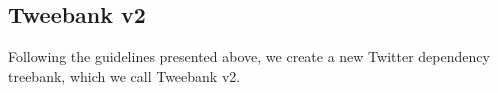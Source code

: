 \documentclass[11pt,a4paper]{article}
\begin{document}


\subsection{\sc Tweebank v2}\label{sec:anno-process}
Following the guidelines presented above, we create a new Twitter
dependency treebank, which we call {\sc Tweebank v2}.
\end{document}
